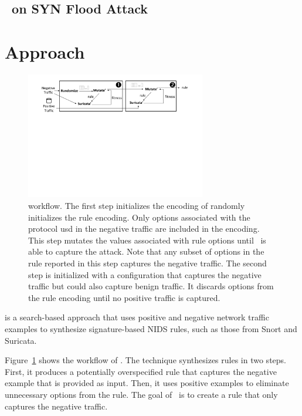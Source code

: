 \documentclass[conference]{IEEEtran}
\begin{document}
\subsection{\tname\ on SYN Flood Attack}


\section{Approach}

\begin{figure}[t]
\centering
\includegraphics[trim=60 400 65 0,clip,width=0.7\textwidth]{figs/nids-workflow}
\caption{\tname workflow. The first step initializes the encoding of
  randomly initializes the rule encoding. Only options associated with
  the protocol usd in the negative traffic are included in the
  encoding. This step mutates the values associated with rule options
  until \suri\ is able to capture the attack.  Note that any subset of
  options in the rule reported in this step captures the negative
  traffic. The second step is initialized with a configuration that
  captures the negative traffic but could also capture benign
  traffic. It discards options from the rule encoding until no
  positive traffic is captured.}
\label{fig:overview}
\end{figure}

\tname{} is a search-based approach that uses positive and negative
network traffic examples to synthesize signature-based NIDS rules,
such as those from Snort and Suricata.

Figure~\ref{fig:overview} shows the workflow of \tname{}.  The
technique synthesizes rules in two steps. First, it produces a
potentially overspecified rule that captures the negative example that
is provided as input. Then, it uses positive examples to eliminate
unnecessary options from the rule. The goal of \tname\ is to create a
rule that only captures the negative traffic.
\end{document}

